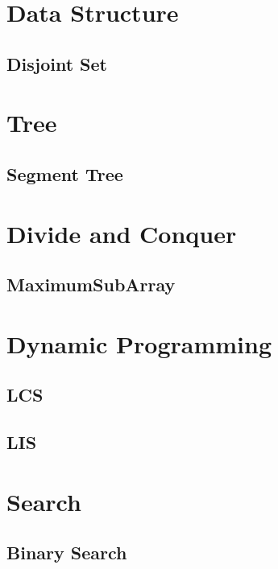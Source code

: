 \section{Data Structure}

\subsection{Disjoint Set}

\section{Tree}

\subsection{Segment Tree}

\section{Divide and Conquer}

\subsection{MaximumSubArray}

\section{Dynamic Programming}

\subsection{LCS}


\subsection{LIS}

\section{Search}

\subsection{Binary Search}

